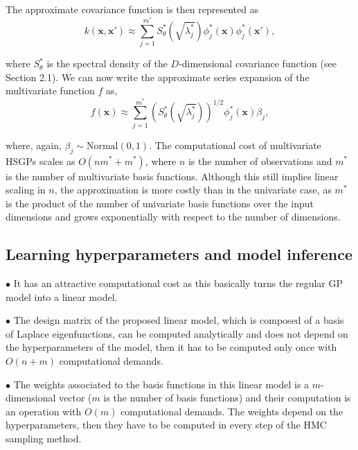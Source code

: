 \documentclass[]{interact}
\theoremstyle{plain}%
\theoremstyle{definition}
\theoremstyle{remark}
\begin{document}
\noindent The approximate covariance function is then represented as
%
\begin{equation}\label{approxcov_multi}
k(\mathbf{x},\mathbf{x}') \approx \sum_{j=1}^{m^{\ast}} 
S^{\ast}_{\theta}\left(\sqrt{\lambda^{\ast}_j}\right)
\phi^{\ast}_j(\mathbf{x}) \phi^{\ast}_j(\mathbf{x}'),
\end{equation}

\noindent where $S^{\ast}_{\theta}$ is the spectral density of the $D$-dimensional covariance function (see Section 2.1). We can now write the approximate series expansion of the multivariate function $f$ as,
%
\begin{equation}\label{approxf}
f(\mathbf{x}) \approx \sum_{j=1}^{m^{\ast}} 
\left( S^{\ast}_{\theta} \left(\sqrt{\lambda^{\ast}_j} \right)\right)^{1/2}
\phi^{\ast}_j(\mathbf{x}) \beta_j, 
\end{equation}

\noindent where, again, $\beta_j \sim \text{Normal}(0,1)$. The computational cost of multivariate HSGPs scales as $O(n m^{\ast} + m^{\ast})$, where $n$ is the number of observations and $m^{\ast}$ is the number of multivariate basis functions. Although this still implies linear scaling in $n$, the approximation is more costly than in the univariate case, as $m^{\ast}$ is the product of the number of univariate basis functions over the input dimensions and grows exponentially with respect to the number of  dimensions.

\subsection{Learning hyperparameters and model inference}

\vspace{2mm}
$\bullet$ It has an attractive computational cost as this basically turns the regular GP model into a linear model.

\vspace{2mm}
$\bullet$ The design matrix of the proposed linear model, which is composed of a basis of Laplace eigenfunctions, can be computed analytically and does not depend on the hyperparameters of the model, then it has to be computed only once with $O(n+m)$ computational demands.

\vspace{2mm}
$\bullet$ The weights associated to the basis functions in this linear model is a $m$-dimensional vector ($m$ is the number of basis functions) and their computation is an operation with $O(m)$ computational demands. The weights depend on the hyperparameters, then they have to be computed in every step of the HMC sampling method.
\end{document}
